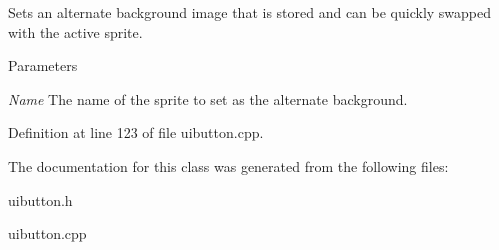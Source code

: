 Sets an alternate background image that is stored and can be quickly swapped with the active sprite. 


\begin{DoxyParams}{Parameters}
\item[{\em Name}]The name of the sprite to set as the alternate background. \end{DoxyParams}


Definition at line 123 of file uibutton.cpp.



The documentation for this class was generated from the following files:\begin{DoxyCompactItemize}
\item 
uibutton.h\item 
uibutton.cpp\end{DoxyCompactItemize}

